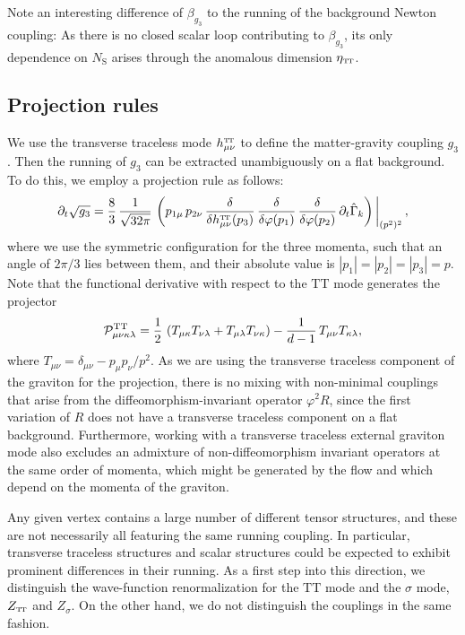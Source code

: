 \documentclass[11pt]{book} %
\newcommand\TTspace{ -1pt }
\newcommand\hTTmunu{ h^{\scriptscriptstyle{\mathrm{T\hspace{\TTspace}T}}}_{\mu\nu} }
\newcommand\etaTT{ \eta_{\scriptscriptstyle{\mathrm{T\hspace{\TTspace}T}}} }
\newcommand\ZTT{ Z_{\scriptscriptstyle{\mathrm{T\hspace{\TTspace}T}}} }
\newcommand\NS{ N_{\scriptscriptstyle{\mathrm{S}}} }
\numberwithin{equation}{chapter}
\begin{document}
Note an interesting difference of $\beta_{g_3}$ to the running of the background Newton coupling:
As there is no closed scalar loop contributing to $\beta_{g_3}$,
its only dependence on $\NS$ arises through the anomalous dimension $\etaTT$.


\subsection{Projection rules}

We use the transverse traceless mode $\hTTmunu$
to define the matter-gravity coupling $g_3$.
Then the running of $g_3$ can be extracted unambiguously on a flat background.
To do this, we employ a projection rule as follows:
\begin{align}
  \partial_t \sqrt{g_3} = \frac{8}{3} \, \frac{1}{\sqrt{32 \pi}} \,
  \left(
    p_{1\mu} \, p_{2\nu}  \,
    \frac{\delta}{\delta \hTTmunu(p_3)} \, \frac{\delta}{\delta\varphi(p_1)} \, \frac{\delta}{\delta\varphi(p_2)} \,
    \partial_t \hat \Gamma_k
  \right) \bigg|_{(p^2)^2} \,,
  \label{projectiong3}
\end{align}
where we use the symmetric configuration for the three momenta,
such that an angle of $2\pi/3$ lies between them, and their absolute value is $|p_1| = |p_2|=|p_3| =p$.
Note that the functional derivative with respect to the $\mathrm{TT}$ mode generates the projector
\begin{align}
  \mathcal{P}^{\rm TT}_{\mu\nu\kappa\lambda} = \frac{1}{2} \,
  \left(
    T_{\mu
    \kappa}T_{\nu \lambda}
    + T_{\mu\lambda}T_{\nu \kappa}
  \right)
  - \frac{1}{d-1} \, T_{\mu\nu}T_{\kappa\lambda},
  \label{projector}
\end{align}
where $T_{\mu \nu}=\delta_{\mu\nu}-p_{\mu}p_{\nu}/p^2$.
As we are using the transverse traceless component of the graviton for the projection,
there is no mixing with non-minimal couplings that arise from the diffeomorphism-invariant
operator $\varphi^2 R$, since the first variation of $R$ does not have a transverse traceless
component  on a flat background.
Furthermore, working with a transverse traceless external graviton mode also excludes an admixture
of non-diffeomorphism invariant operators at the same order of momenta,
which might be generated by the flow and which depend on the momenta of the graviton.

Any given vertex contains a large number of different tensor structures,
and these are not necessarily all featuring the same running coupling.
In particular, transverse traceless structures and scalar structures could be expected to exhibit
prominent differences in their running. As a first step into this direction,
we distinguish the wave-function renormalization for the $\mathrm{TT}$ mode and the $\sigma$ mode,
$\ZTT$ and $Z_{\sigma}$. On the other hand, we do not distinguish the couplings in the same fashion.
\end{document}
